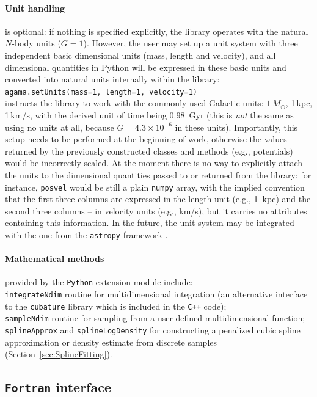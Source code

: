 \documentclass[12pt]{article}
\newcommand{\Cpp}  {\texttt{C++}\xspace}
\newcommand{\Python}{\texttt{Python}\xspace}
\newcommand{\Fortran}{\texttt{Fortran}\xspace}
\begin{document}
\paragraph{Unit handling} is optional: if nothing is specified explicitly, the library operates with the natural $N$-body units ($G=1$). However, the user may set up a unit system with three independent basic dimensional units (mass, length and velocity), and all dimensional quantities in Python will be expressed in these basic units and converted into natural units internally within the library:\\
\texttt{agama.setUnits(mass=1, length=1, velocity=1)}\\
instructs the library to work with the commonly used Galactic units: $1\,M_\odot$, 1\,kpc, 1\,km/s, with the derived unit of time being 0.98~Gyr (this is \textit{not} the same as using no units at all, because $G=4.3\times10^{-6}$ in these units). Importantly, this setup needs to be performed at the beginning of work, otherwise the values returned by the previously constructed classes and methods (e.g., potentials) would be incorrectly scaled.
At the moment there is no way to explicitly attach the units to the dimensional quantities passed to or returned from the library: for instance, \texttt{posvel} would be still a plain \texttt{numpy} array, with the implied convention that the first three columns are expressed in the length unit (e.g., 1~kpc) and the second three columns -- in velocity units (e.g., km/s), but it carries no attributes containing this information. In the future, the unit system may be integrated with the one from the \texttt{astropy} framework \cite{Astropy}.

\paragraph{Mathematical methods} provided by the \Python extension module include:\\
\texttt{integrateNdim} routine for multidimensional integration (an alternative interface to the \texttt{cubature} library which is included in the \Cpp code);\\
\texttt{sampleNdim} routine for sampling from a user-defined multidimensional function;\\
\texttt{splineApprox} and \texttt{splineLogDensity} for constructing a penalized cubic spline approximation or density estimate from discrete samples (Section~\ref{sec:SplineFitting}).

\subsection{\Fortran interface}  \label{sec:Fortran}
\end{document}
